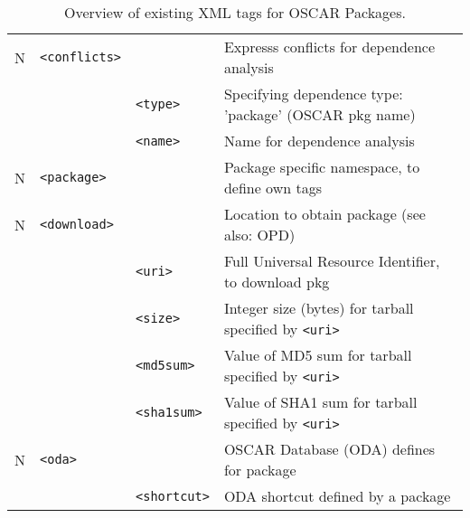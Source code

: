 \begin{table}[h!]
\begin{small}
\begin{center}
\begin{tabular}{|c|l|l|l|}
  N & \verb|<conflicts>|
  		&   
		& Expresss conflicts for dependence analysis
		\\\cline{3-4}
%
    & 
		& \verb|<type>|    
		& Specifying dependence type: 'package'  (OSCAR pkg name)
		\\\cline{3-4}
%
	&
		& \verb|<name>|
		& Name for dependence analysis
		\\\hline

  N & \verb|<package>| 
		&    
		& Package specific namespace, to define own tags
		\\\hline

  N & \verb|<download>| 
		&    
		& Location to obtain package (see also: OPD)
		\\\cline{3-4}
%
    & 
		& \verb|<uri>|   
		& Full Universal Resource Identifier, to download pkg
		\\\cline{3-4}
%
    & 
		& \verb|<size>|   
		& Integer size (bytes) for tarball specified by \verb|<uri>|
		\\\cline{3-4}
%
    & 
		& \verb|<md5sum>|   
		& Value of MD5 sum for tarball specified by \verb|<uri>|
		\\\cline{3-4}
%
    & 
		& \verb|<sha1sum>|   
		& Value of SHA1 sum for tarball specified by \verb|<uri>|
		\\\hline

  N & \verb|<oda>|     
		&    
		& OSCAR Database (ODA) defines for package     
		\\\cline{3-4}
%
    & 
		& \verb|<shortcut>|   
		& ODA shortcut defined by a package            
		\\\hline


  \end{tabular}
  \end{center}  
\end{small}
  \caption{Overview of existing XML tags for OSCAR Packages.}  
  \label{tab:pkg-xml-tags}
\end{table}

